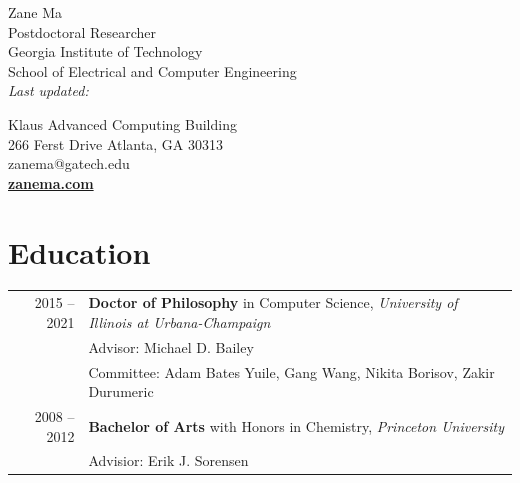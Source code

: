 \documentclass[10pt,singlecolumn]{article} %
\def\parsedate #1:20#2#3#4#5#6#7#8\empty{20#2#3/#4#5/#6#7}
\def\moddate#1{\expandafter\parsedate\pdffilemoddate{#1}\empty}
\begin{document}
\color{text1} %

\begin{minipage}[t]{0.5\textwidth}
{\Huge Zane Ma} \vspace{0.5cm}\\ %
Postdoctoral Researcher  \\
Georgia Institute of Technology \\
School of Electrical and Computer Engineering \\
\emph{Last updated: \moddate{\jobname.tex}}

\end{minipage}
\begin{minipage}[t]{0.5\textwidth}
\begin{flushright}
\vspace{\baselineskip}
Klaus Advanced Computing Building \\
266 Ferst Drive Atlanta, GA 30313 \\
zanema@gatech.edu \\ 
\textbf{\href{https://zanema.com}{zanema.com}}
\end{flushright}
\end{minipage}



\vspace{0.3cm}
\section{Education} 

\begin{tabular}{rl} %


2015 -- 2021 & \textbf{Doctor of Philosophy} in Computer Science, \emph{University of Illinois at Urbana-Champaign}\\ 
& Advisor: Michael D. Bailey \\
& Committee: Adam Bates Yuile, Gang Wang, Nikita Borisov, Zakir Durumeric \\
	 

2008 -- 2012 & \textbf{Bachelor of Arts} with Honors in Chemistry,  \emph{Princeton University}\\
& Advisior: Erik J. Sorensen \\
	  
\end{tabular} \\
\end{document}
